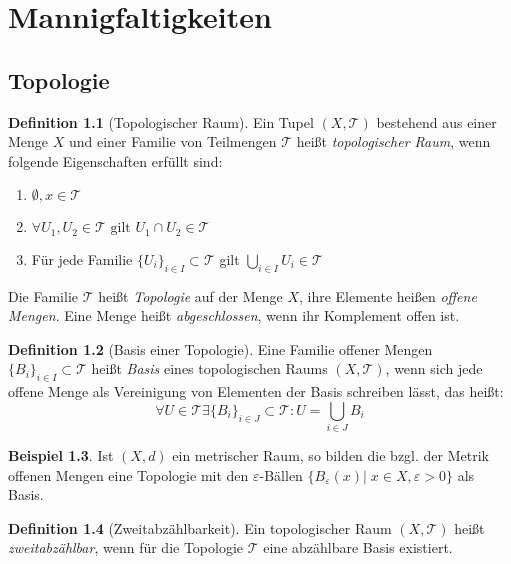 \documentclass[a4paper]{scrreprt}
\numberwithin{equation}{chapter}
\theoremstyle{definition}
\newtheorem{defn}{Definition}[section]
\newtheorem{bsp}[defn]{Beispiel}
\begin{document}
\chapter{Mannigfaltigkeiten}
	\section{Topologie}
		\begin{defn}[Topologischer Raum]
			Ein Tupel $(X,\mathcal{T})$ bestehend aus einer Menge $X$ und einer Familie von Teilmengen $\mathcal{T}$ heißt \emph{topologischer Raum}, wenn folgende Eigenschaften erfüllt sind:
			\begin{enumerate}[label=$T$\arabic*]
				\item $\emptyset, x\in \mathcal{T}$
				\item $\forall U_1, U_2\in \mathcal{T} \text{ gilt }U_1\cap U_2\in\mathcal{T}$
				\item Für jede Familie $\lbrace U_i\rbrace_{i\in I}\subset \mathcal{T}$ gilt $\bigcup_{i\in I}U_i\in\mathcal{T}$
			\end{enumerate}
			Die Familie $\mathcal{T}$ heißt \emph{Topologie} auf der Menge $X$, ihre Elemente heißen \emph{offene Mengen}. Eine Menge heißt \emph{abgeschlossen}, wenn ihr Komplement offen ist.
		\end{defn}
		\begin{defn}[Basis einer Topologie]
			Eine Familie offener Mengen $\lbrace B_i\rbrace_{i\in I}\subset \mathcal{T}$ heißt \emph{Basis} eines topologischen Raums $(X,\mathcal{T})$, wenn sich jede offene Menge als Vereinigung von Elementen der Basis schreiben lässt, das heißt:
			\begin{equation*}
				\forall U\in\mathcal{T}\exists \lbrace B_i\rbrace_{i\in J}\subset \mathcal{T}: U=\bigcup_{i\in J}B_i
			\end{equation*}
		\end{defn}
		\begin{bsp}
			Ist $(X,d)$ ein metrischer Raum, so bilden die bzgl. der Metrik offenen Mengen eine Topologie mit den $\varepsilon$-Bällen $\lbrace B_{\varepsilon}(x)\vert \; x\in X, \varepsilon >0\rbrace$ als Basis.
		\end{bsp}
		\begin{defn}[Zweitabzählbarkeit]
			Ein topologischer Raum $(X,\mathcal{T})$ heißt \emph{zweitabzählbar}, wenn für die Topologie $\mathcal{T}$ eine abzählbare Basis existiert. 
		\end{defn}
\end{document}
